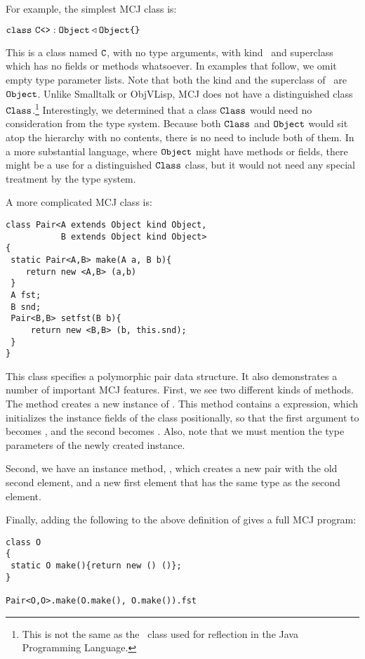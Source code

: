 \documentclass[nocopyrightspace,10pt]{acm-sigplan}
\begin{document}
For example, the simplest MCJ class is:

\vspace{.1cm}
$\mathtt{{class}}\ {\mathtt{{C}}}\mbox{\tt <}\mbox{\tt >} : \mbox{\tt Object} \triangleleft \mbox{\tt Object} \mbox{\tt \{}\mbox{\tt \}}$
\vspace{.1cm}

This is a class named $\mathtt{{C}}$, with no type arguments, with kind \Object\
and superclass \Object\, which has no fields or methods whatsoever.
In examples that follow, we omit empty type parameter lists.  Note
that both the kind and the superclass of \C\ are $\mbox{\tt Object}$.  Unlike
Smalltalk or ObjVLisp, MCJ does not have a distinguished class
$\mbox{\tt Class}$.\footnote{This is not the same as the \Class\ class used for
  reflection in the Java Programming Language.}  Interestingly, we
determined that a class $\mbox{\tt Class}$ would need no consideration from the
type system.  Because both $\mbox{\tt Class}$ and $\mbox{\tt Object}$ would sit atop the
hierarchy with no contents, there is no need to include both of them.
In a more substantial language, where $\mbox{\tt Object}$ might have methods or
fields, there might be a use for a distinguished $\mbox{\tt Class}$ class, but
it would not need any special treatment by the type system.

A more complicated MCJ class is:

\begin{verbatim}
class Pair<A extends Object kind Object,
           B extends Object kind Object>
{
 static Pair<A,B> make(A a, B b){ 
    return new <A,B> (a,b) 
 } 
 A fst;
 B snd;
 Pair<B,B> setfst(B b){
     return new <B,B> (b, this.snd);
 }
}
\end{verbatim}

This class specifies a polymorphic pair data structure.  It also
demonstrates a number of important MCJ features.  First, we see two
different kinds of methods.  The {\txt{make}} method creates a new
instance of {\txt{Pair}}.  This method contains a {\txt{new}}
expression, which initializes the instance fields of the class
positionally, so that the first argument to {} becomes
{\txt{fst}}, and the second becomes {\txt{snd}}.  Also, note that we
must mention the type parameters of the newly created instance.

Second, we have an instance method, {}, which creates a new
pair with the old second element, and a new first element that has
the same type as the second element.

Finally, adding the following to the above definition of {}
gives a full MCJ program:

\begin{verbatim}
class O
{
 static O make(){return new () ()};
}

Pair<O,O>.make(O.make(), O.make()).fst
\end{verbatim}
\end{document}
